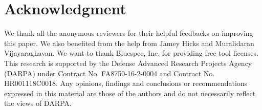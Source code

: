 \documentclass[conference]{IEEEtran}
\begin{document}
\section*{Acknowledgment}
We thank all the anonymous reviewers for their helpful feedbacks on improving this paper.
We also benefited from the help from Jamey Hicks and Muralidaran Vijayaraghavan.
We want to thank Bluespec, Inc. for providing free tool licenses.
This research is supported by the Defense Advanced Research Projects Agency (DARPA) under Contract No. FA8750-16-2-0004 and Contract No. HR001118C0018.
Any opinions, findings and conclusions or recommendations expressed in this material are those of the authors and do not necessarily reflect the views of DARPA.




\end{document}
